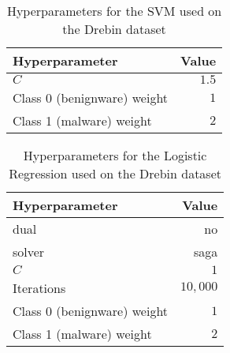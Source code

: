 \begin{table}[p]
	\centering
	\begin{tabular}{l r}
		Hyperparameter & Value \\
		\hline
		$C$ & $1.5$\\
		Class 0 (benignware) weight & $1$\\
		Class 1 (malware) weight & $2$\\
		\hline
	\end{tabular}
	\caption{Hyperparameters for the SVM used on the Drebin dataset}
	\label{tab:svmdrebin}
\end{table}

\begin{table}[p]
	\centering
	\begin{tabular}{l r}
		Hyperparameter & Value \\
		\hline
		dual & no\\
		solver & saga\\
		$C$ & $1$\\
		Iterations & $10,000$\\
		Class 0 (benignware) weight & $1$\\
		Class 1 (malware) weight & $2$\\
		\hline
	\end{tabular}
	\caption{Hyperparameters for the Logistic Regression used on the Drebin dataset}
	\label{tab:lrdrebin}
\end{table}